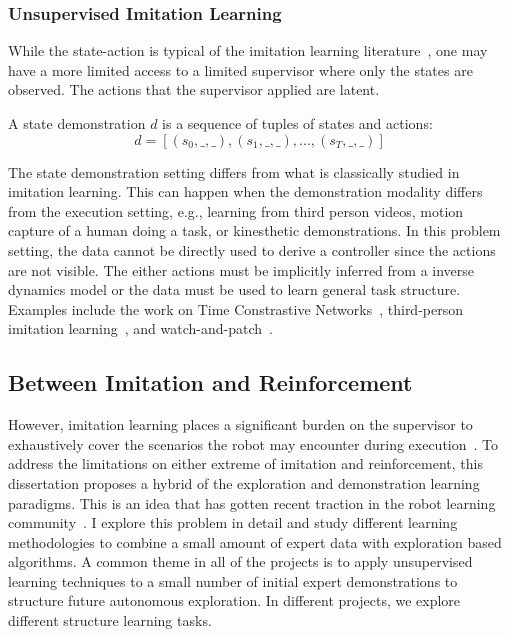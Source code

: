 \subsubsection{Unsupervised Imitation Learning}
While the state-action is typical of the imitation learning literature~\cite{osa2018algorithmic}, one may have a more limited access to a limited supervisor where only the states are observed. The actions that the supervisor applied are latent.

\begin{definition}
A state demonstration $d$ is a sequence of tuples of states and actions:
\[d = [(s_0,\_,\_),(s_1,\_,\_),...,(s_T,\_,\_)]\]
\end{definition}

The state demonstration setting differs from what is classically studied in imitation learning. 
This can happen when the demonstration modality differs from the execution setting, e.g., learning from third person videos, motion capture of a human doing a task, or kinesthetic demonstrations. 
In this problem setting, the data cannot be directly used to derive a controller since the actions are not visible.
The either actions must be implicitly inferred from a inverse dynamics model or the data must be used to learn general task structure.
Examples include the work on Time Constrastive Networks~\cite{sermanet2017time}, third-person imitation learning~\cite{stadie2017third}, and watch-and-patch~\cite{wu2018watch}.

\subsection{Between Imitation and Reinforcement}
However, imitation learning places a significant burden on the supervisor to exhaustively cover the scenarios the robot may encounter during execution~\cite{laskey2017iterative}.
To address the limitations on either extreme of imitation and reinforcement, this dissertation proposes a hybrid of the exploration and demonstration learning paradigms. This is an idea that has gotten recent traction in the robot learning community~\cite{duan2017one, james2017transferring}. I explore this problem in detail and study different learning methodologies to combine a small amount of expert data with exploration based algorithms. A common theme in all of the projects is to apply unsupervised learning techniques to a small number of initial expert demonstrations to structure future autonomous exploration. In different projects, we explore different structure learning tasks.

